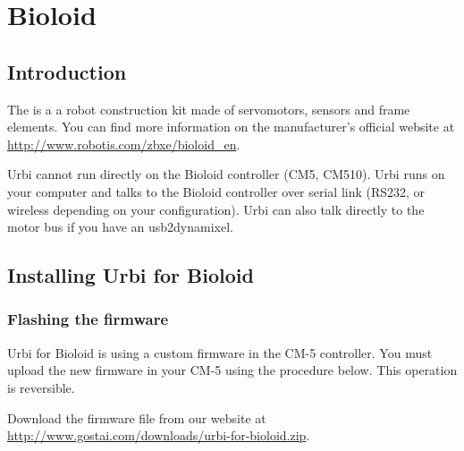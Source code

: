 
\chapter{Bioloid}
\label{sec:bioloid}

\section{Introduction}

The  is a a robot construction kit made of servomotors, sensors
and frame elements. You can find more information on the manufacturer's
official website at \url{http://www.robotis.com/zbxe/bioloid_en}.

Urbi cannot run directly on the Bioloid controller (CM5, CM510). Urbi runs
on your computer and talks to the Bioloid controller over serial link
(RS232, or wireless depending on your configuration). Urbi can also talk
directly to the motor bus if you have an usb2dynamixel.

\section{Installing Urbi for Bioloid}

\subsection{Flashing the firmware}

Urbi for Bioloid is using a custom firmware in the CM-5 controller. You must
upload the new firmware in your CM-5 using the procedure below. This
operation is reversible.

Download the firmware file from our website at
\url{http://www.gostai.com/downloads/urbi-for-bioloid.zip}.


